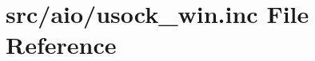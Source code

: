 \hypertarget{usock__win_8inc}{}\section{src/aio/usock\+\_\+win.inc File Reference}
\label{usock__win_8inc}
